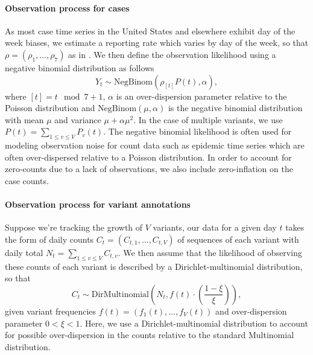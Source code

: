 \paragraph{Observation process for cases}%

As most case time series in the United States and elsewhere exhibit day of the week biases, we estimate a reporting rate which varies by day of the week, so that $\rho = (\rho_{1}, \ldots, \rho_{7})$ as in \cite{Abbott2020}.
We then define the observation likelihood using a negative binomial distribution as follows
\begin{equation}
  Y_{t} \sim \text{NegBinom}(\rho_{[t]} P(t),  \alpha),
\end{equation}
where $[t] = t \mod 7 + 1$, $\alpha$ is an over-dispersion parameter relative to the Poisson distribution and $\text{NegBinom}(\mu, \alpha)$ is the negative binomial distribution with mean $\mu$ and variance  $\mu + \alpha\mu^{2}$. In the case of multiple variants, we use $P(t) = \sum_{1\leq v \leq V} P_{v}(t)$.
The negative binomial likelihood is often used for modeling observation noise for count data such as epidemic time series which are often over-dispersed relative to a Poisson distribution.
In order to account for zero-counts due to a lack of observations, we also include zero-inflation on the case counts.

\paragraph{Observation process for variant annotations}%

Suppose we're tracking the growth of $V$ variants, our data for a given day $t$ takes the form of daily counts $C_{t} = (C_{t,1}, \ldots, C_{t,V})$ of sequences of each variant with daily total $N_{t} = \sum_{1\leq v \leq V} C_{t, v}$.
We then assume that the likelihood of observing these counts of each variant is described by a Dirichlet-multinomial distribution, so that
\begin{equation}
    C_{t} \sim \text{DirMultinomial}\left(N_{t}, f(t)\cdot \left(\frac{1-\xi}{\xi}\right)\right),
\end{equation}
given variant frequencies $f(t) = (f_{1}(t), \ldots, f_{V}(t))$ and over-dispersion parameter $0<\xi<1$.
Here, we use a Dirichlet-multinomial distribution to account for possible over-dispersion in the counts relative to the standard Multinomial distribution.


